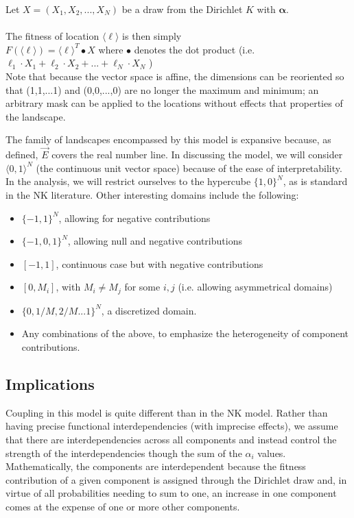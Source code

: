 \documentclass[12pt]{article}
\begin{document}
Let $X  = (X_1, X_2,..., X_N)$ be a draw from the Dirichlet $K$ with $\boldsymbol\alpha$.\\~\\

The fitness of location $\langle \ell \rangle$ is then simply \\
 $F(\langle \ell \rangle) ={\langle \ell \rangle}^T \bullet X$ where $\bullet$ denotes the dot product (i.e. $ \ell_1 \cdot X_1 + \ell_2 \cdot X_2 +...+\ell_N \cdot X_N$ )\\

Note that because the vector space is affine, the dimensions can be reoriented so that (1,1,...1) and (0,0,...,0) are no longer the maximum and minimum; an arbitrary mask can be applied to the locations without effects that properties of the landscape.

The family of landscapes encompassed by this model is expansive because, as defined, $\vec{E}$ covers the real number line. In discussing the model, we will consider $\langle 0,1 \rangle ^N$ (the continuous unit vector space) because of the ease of interpretability. In the analysis, we will restrict ourselves to the hypercube $\{ 1,0 \} ^N$, as is standard in the NK literature. Other interesting domains include the following:
\begin{itemize}
  \item $\{-1,1 \} ^N$, allowing for negative contributions
  \item $\{-1,0,1 \} ^N$, allowing null and negative contributions
  \item $[-1,1]$, continuous case but with negative contributions
  \item $[0, M_i]$, with $M_i \neq M_j$ for some $i, j$ (i.e. allowing asymmetrical domains)
  \item $\{ 0, 1/M, 2/M...1 \} ^N$, a discretized domain.
  \item Any combinations of the above, to emphasize the heterogeneity of component contributions.
\end{itemize}




\subsection*{Implications}



Coupling in this model is quite different than in the NK model. Rather than having precise functional interdependencies (with imprecise effects), we assume that there are interdependencies across all components and instead control the strength of the interdependencies though the sum of the $\alpha_i$ values. Mathematically, the components are interdependent because the fitness contribution of a given component is assigned through the Dirichlet draw and, in virtue of all probabilities needing to sum to one, an increase in one component comes at the expense of one or more other components.
\end{document}
